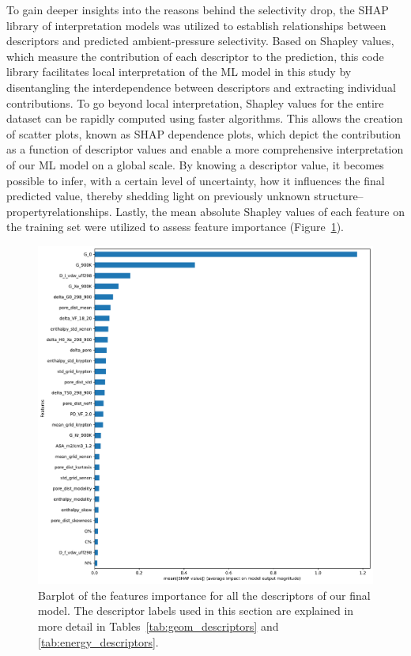 \documentclass[main]{subfiles}
\begin{document}
To gain deeper insights into the reasons behind the selectivity drop, the SHAP library of interpretation models\autocite{SHAP,molnar2020interpretable} was utilized to establish relationships between descriptors and predicted ambient-pressure selectivity. Based on Shapley values\autocite{shapley1953value}, which measure the contribution of each descriptor to the prediction, this code library facilitates local interpretation of the ML model in this study by disentangling the interdependence between descriptors and extracting individual contributions. To go beyond local interpretation, Shapley values for the entire dataset can be rapidly computed using faster algorithms.\autocite{SHAP} This allows the creation of scatter plots, known as SHAP dependence plots, which depict the contribution as a function of descriptor values and enable a more comprehensive interpretation of our ML model on a global scale. By knowing a descriptor value, it becomes possible to infer, with a certain level of uncertainty, how it influences the final predicted value, thereby shedding light on previously unknown structure--propertyrelationships. Lastly, the mean absolute Shapley values of each feature on the training set were utilized to assess feature importance (Figure~\ref{fgr:featimp_shap}).

\begin{figure}[ht]
  \centering
    \includegraphics[width=0.70\linewidth]{figures/4-ml/SI_figure/Feature_importance_shapbased.pdf}
    \caption{Barplot of the features importance for all the descriptors of our final model. The descriptor labels used in this section are explained in more detail in Tables~\ref{tab:geom_descriptors} and \ref{tab:energy_descriptors}.}\label{fgr:featimp_shap}
  \end{figure}
\end{document}
